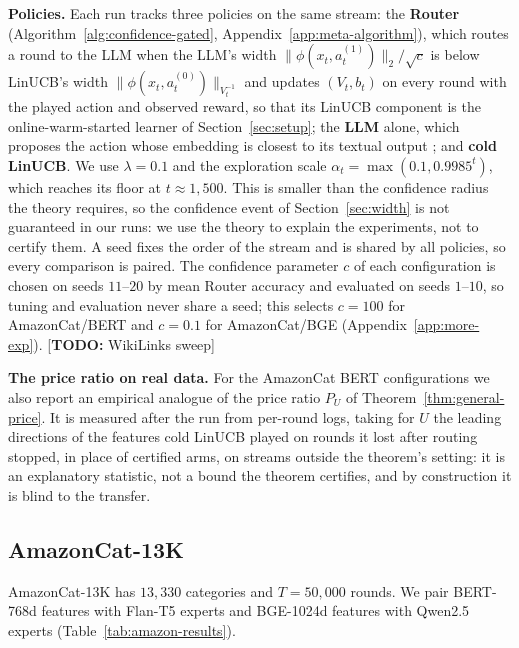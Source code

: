 \documentclass{article}
\theoremstyle{definition}
\theoremstyle{remark}
\theoremstyle{remark}
\newcommand{\todo}[1]{\textcolor{red!70!black}{[\textbf{TODO:} #1]}}
\begin{document}
\textbf{Policies.} Each run tracks three policies on the same stream: the
\textbf{Router} (Algorithm~\ref{alg:confidence-gated},
Appendix~\ref{app:meta-algorithm}), which routes a round to the LLM when the
LLM's width $\|\phi(x_t,a_t^{(1)})\|_2/\sqrt c$ is below LinUCB's width
$\|\phi(x_t,a_t^{(0)})\|_{V_t^{-1}}$ and updates $(V_t,b_t)$ on every round
with the played action and observed reward, so that its LinUCB component is
the online-warm-started learner of Section~\ref{sec:setup}; the \textbf{LLM}
alone, which proposes the action whose embedding is closest to its textual
output \cite{chen2024llmdecision}; and \textbf{cold LinUCB}. We use
$\lambda=0.1$ and the exploration scale $\alpha_t=\max(0.1,0.9985^t)$, which
reaches its floor at $t\approx1{,}500$. This is smaller than the confidence
radius the theory requires, so the confidence event of
Section~\ref{sec:width} is not guaranteed in our runs: we use the theory to
explain the experiments, not to certify them. A seed fixes the order of the
stream and is shared by all policies, so every comparison is paired. The
confidence parameter $c$ of each configuration is chosen on seeds $11$--$20$
by mean Router accuracy and evaluated on seeds $1$--$10$, so tuning and
evaluation never share a seed; this selects $c=100$ for AmazonCat/BERT and
$c=0.1$ for AmazonCat/BGE (Appendix~\ref{app:more-exp}).
\todo{WikiLinks sweep}

\textbf{The price ratio on real data.} For the AmazonCat BERT configurations
we also report an empirical analogue of the price ratio $P_U$ of
Theorem~\ref{thm:general-price}. It is measured after the run from per-round
logs, taking for $U$ the leading directions of the features cold LinUCB
played on rounds it lost after routing stopped, in place of certified arms,
on streams outside the theorem's setting: it is an explanatory statistic, not
a bound the theorem certifies, and by construction it is blind to the
transfer.

\subsection{AmazonCat-13K}
\label{sec:amazon}

AmazonCat-13K has $13{,}330$ categories and $T=50{,}000$ rounds. We pair
BERT-768d features with Flan-T5 experts and BGE-1024d features with Qwen2.5
experts (Table~\ref{tab:amazon-results}).
\end{document}
